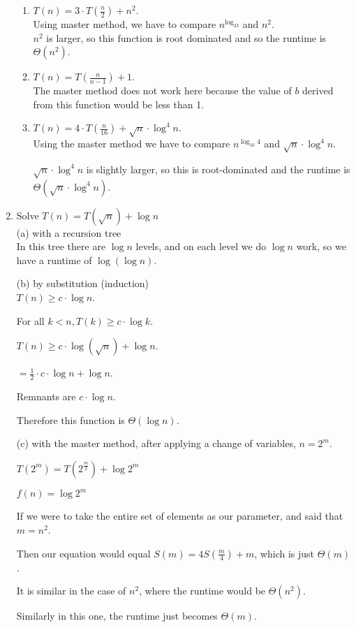 \documentclass[12pt]{article}
\begin{document}
\begin{enumerate}
\begin{enumerate}
\item  $T(n) =  3\cdot T(\frac{n}{2}) + n^2$.\\

Using master method, we have to compare $n^{\log_23}$ and $n^2$.\\
$n^2$ is larger, so this function is root dominated and so the runtime is $\Theta(n^2)$.\\
  
\item $T(n) =   T(\frac{n}{n{-}1}) + 1$.\\

The master method does not work here because the value of $b$ derived from this function would be less than 1.\\
  
\item  $T(n) =  4\cdot T(\frac{n}{16}) + \sqrt{n}\cdot\log^4n$. \\

Using the master method we have to compare $n^{\log_{16}4}$ and $\sqrt{n}\cdot\log^4n$.

$\sqrt{n}\cdot\log^4n$ is slightly larger, so this is root-dominated and the runtime is $\Theta(\sqrt{n}\cdot\log^4n)$.
\end{enumerate}

\pagebreak
  
  
\item  Solve $T(n) = T(\sqrt{n}) + \log n$\\
(a) with a recursion tree       \\



In this tree there are $\log n$ levels, and on each level we do $\log n$ work, so we have a runtime of $\log(\log n)$.

(b) by substitution (induction)\\

$T(n) \geq c \cdot \log n$.

For all $k < n, T(k) \geq c \cdot \log k$.

$T(n) \geq c \cdot \log(\sqrt n) + \log n$.

$= \frac{1}{2} \cdot c \cdot \log n + \log n$.

Remnants are $c \cdot \log n$.

Therefore this function is $\Theta(\log n)$.

(c) with the master method, after applying a change of variables, $n=2^m$. 

$T(2^m) = T(2^{\frac{m}{2}}) + \log 2^m$

$f(n) = \log 2^m$

If we were to take the entire set of elements as our parameter, and said that $m=n^2$.

Then our equation would  equal $S(m) = 4S(\frac{m}{4}) + m$, which is just $\Theta(m)$. 

It is similar in the case of $n^2$, where the runtime would be $\Theta(n^2)$.

Similarly in this one, the runtime just becomes $\Theta(m)$.

\end{enumerate}
\end{document}
